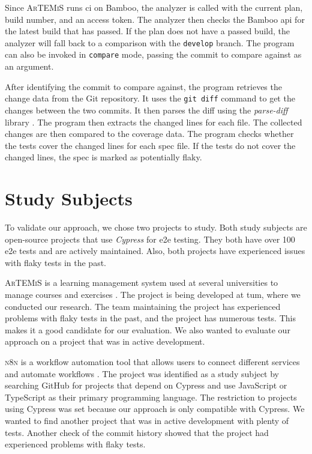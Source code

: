 Since \textsc{ArTEMiS} runs \ac{ci} on Bamboo, the analyzer is called with the current plan, build number, and an access token.
The analyzer then checks the Bamboo \ac{api} for the latest build that has passed.
If the plan does not have a passed build, the analyzer will fall back to a comparison with the \texttt{develop} branch.
The program can also be invoked in \texttt{compare} mode, passing the commit to compare against as an argument.

After identifying the commit to compare against, the program retrieves the change data from the Git repository.
It uses the \texttt{git diff} command to get the changes between the two commits.
It then parses the diff using the \textit{parse-diff} library \autocite{todyshev_parse-diff_2023}.
The program then extracts the changed lines for each file.
The collected changes are then compared to the coverage data.
The program checks whether the tests cover the changed lines for each spec file.
If the tests do not cover the changed lines, the spec is marked as potentially flaky.

\section{Study Subjects}
To validate our approach, we chose two projects to study.
Both study subjects are open-source projects that use \textit{Cypress} for \ac{e2e} testing.
They both have over 100 \ac{e2e} tests and are actively maintained.
Also, both projects have experienced issues with flaky tests in the past.

\textsc{ArTEMiS} is a learning management system used at several universities to manage courses and exercises \autocite{krusche_artemis_2018}.
The project is being developed at \ac{tum}, where we conducted our research.
The team maintaining the project has experienced problems with flaky tests in the past, and the project has numerous tests.
This makes it a good candidate for our evaluation.
We also wanted to evaluate our approach on a project that was in active development.

\textsc{n8n} is a workflow automation tool that allows users to connect different services and automate workflows \autocite{noauthor_n8n_2023}.
The project was identified as a study subject by searching GitHub for projects that depend on Cypress and use JavaScript or TypeScript as their primary programming language.
The restriction to projects using Cypress was set because our approach is only compatible with Cypress.
We wanted to find another project that was in active development with plenty of tests.
Another check of the commit history showed that the project had experienced problems with flaky tests.

